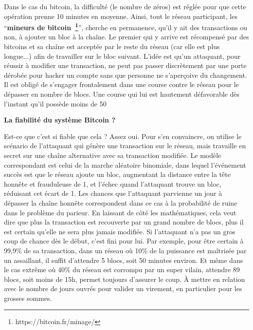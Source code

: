 \documentclass[11pt,twoside,a4paper]{article}
\begin{document}
	Dans le cas du bitcoin, la difficult{\'e} (le nombre de z{\'e}ros) est r{\'e}gl{\'e}e pour que cette op{\'e}ration prenne 10 minutes en moyenne. Ainsi, tout le r{\'e}seau participant, les ``\textbf{mineurs de bitcoin~\footnote{https://bitcoin.fr/minage/}}'', cherche en permanence, qu'il y ait des transactions ou non, {\`a} ajouter un bloc {\`a} la cha{\^i}ne. Le premier qui y arrive est r{\'e}compens{\'e} par des bitcoins et sa cha{\^i}ne est accept{\'e}e par le reste du r{\'e}seau (car elle est plus longue...) afin de travailler sur le bloc suivant. L'id{\'e}e est qu'un attaquant, pour r{\'e}ussir {\`a} modifier une transaction, ne peut pas passer discr{\`e}tement par une porte d{\'e}rob{\'e}e pour hacker un compte sans que personne ne s'aper\c{c}oive du changement. Il est oblig{\'e} de s'engager frontalement dans une course contre le r{\'e}seau pour le d{\'e}passer en nombre de blocs. Une course qui lui est hautement d{\'e}favorable d{\`e}s l'instant qu'il poss{\`e}de moins de 50%

\textbf{La fiabilit{\'e} du syst{\`e}me Bitcoin ?} %

Est-ce que c'est si fiable que cela ? Assez oui. Pour s'en convaincre, on utilise le sc{\'e}nario de l'attaquant qui g{\'e}n{\`e}re une transaction sur le r{\'e}seau, mais travaille en secret sur une cha{\^i}ne alternative avec sa transaction modifi{\'e}e. Le mod{\`e}le correspondant est celui de la marche al{\'e}atoire binomiale, dans lequel l'{\'e}v{\'e}nement succ{\`e}s est que le r{\'e}seau ajoute un bloc, augmentant la distance entre la t{\^e}te honn{\^e}te et frauduleuse de 1, et l'{\'e}chec quand l'attaquant trouve un bloc, r{\'e}duisant cet {\'e}cart de 1. Les chances que l'attaquant parvienne un jour {\`a} d{\'e}passer la cha{\^i}ne honn{\^e}te correspondent dans ce cas {\`a} la probabilit{\'e} de ruine dans le probl{\`e}me du parieur. En laissant de c{\^o}t{\'e} les math{\'e}matiques, cela veut dire que plus la transaction est recouverte par un grand nombre de blocs, plus il est certain qu'elle ne sera plus jamais modifi{\'e}e. Si l'attaquant n'a pas un gros coup de chance d{\`e}s le d{\'e}but, c'est fini pour lui. Par exemple, pour {\^e}tre certain {\`a} 99,9\% de sa transaction, dans un r{\'e}seau o{\`u} 10\% de la puissance est ma{\^i}tris{\'e}e par un assaillant, il suffit d'attendre 5 blocs, soit 50 minutes environ. Et m{\^e}me dans le cas extr{\^e}me o{\`u} 40\% du r{\'e}seau est corrompu par un super vilain, attendre 89 blocs, soit moins de 15h, permet toujours d'assurer le coup. {\`A} mettre en relation avec le nombre de jours ouvr{\'e}s pour valider un virement, en particulier pour les grosses sommes.~\\
\end{document}
